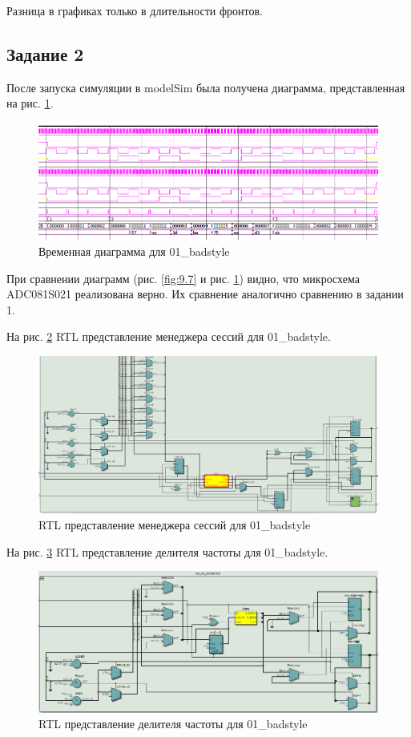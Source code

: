 \documentclass[a4paper,14pt]{article}
\begin{document}
	Разница в графиках только в длительности фронтов.	
		
	\subsection{Задание 2}

	После запуска симуляции в modelSim была получена диаграмма, представленная на рис. \ref{fig:z15msimwvf}.
	
	\begin{figure}[H]
		\centering
		\includegraphics[width=0.9\linewidth]{images/z1_5_msim_wvf}
		\caption{Временная диаграмма для 01\_badstyle}
		\label{fig:z15msimwvf}
	\end{figure}

	При сравнении диаграмм (рис. \ref{fig:9.7} и рис. \ref{fig:z15msimwvf}) видно, что микросхема ADC081S021 реализована верно. Их сравнение аналогично сравнению в задании 1.
	
	На рис. \ref{fig:z15rtl} RTL представление менеджера сессий для 01\_badstyle.
	
	\begin{figure}[H]
		\centering
		\includegraphics[width=0.9\linewidth]{images/z1_5_rtl}
		\caption{RTL представление менеджера сессий для 01\_badstyle}
		\label{fig:z15rtl}
	\end{figure}

	На рис. \ref{fig:z15rtlclkdivider} RTL представление делителя частоты для 01\_badstyle.
	
	\begin{figure}[H]
		\centering
		\includegraphics[width=0.9\linewidth]{images/z1_5_rtl_clk_divider}
		\caption{RTL представление делителя частоты для 01\_badstyle}
		\label{fig:z15rtlclkdivider}
	\end{figure}
\end{document}
